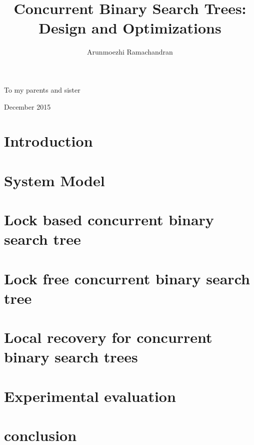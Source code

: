 \documentclass[doublespacing]{utdthesis}
\author{Arunmoezhi Ramachandran}
\title{Concurrent Binary Search Trees: Design and Optimizations}
\begin{document}
\frontmatter

\signaturepage
{} %

\begin{dedication} %
To my parents and sister
\end{dedication}

\maketitle

\begin{acks}{December 2015}

\end{acks}

\begin{preface} %
\prefacetext
\end{preface}

\begin{abstract}

\end{abstract}

\tableofcontents
\listoffigures %
\listoftables %

\mainmatter
\newenvironment{limitscope}{}{}
\chapter{Introduction}
\label{chapter:introduction}


\chapter{System Model}
\label{chapter:systemModel}


\chapter{Lock based concurrent binary search tree}
\label{chapter:castle}


\chapter{Lock free concurrent binary search tree}
\label{chapter:icdcn}


\chapter{Local recovery for concurrent binary search trees}
\label{chapter:localRecovery}


\chapter{Experimental evaluation}
\label{chapter:experiments}


\chapter{conclusion}
\label{chapter:conclusion}




\begin{vita}

\end{vita}
\end{document}
